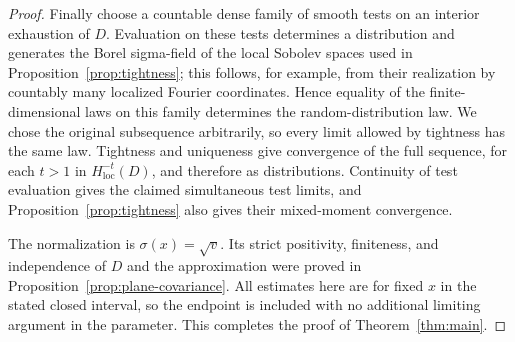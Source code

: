 \begin{proof}
Finally choose a countable dense family of smooth tests on an
interior exhaustion of \(D\).  Evaluation on these tests determines
a distribution and generates the Borel sigma-field of the local
Sobolev spaces used in Proposition~\ref{prop:tightness}; this follows,
for example, from their realization by countably many localized
Fourier coordinates.  Hence equality of the finite-dimensional
laws on this family determines the random-distribution law.
We chose the original subsequence arbitrarily, so every limit
allowed by tightness has the same law.  Tightness and uniqueness
give convergence of the full sequence, for each \(t>1\) in
\(H^{-t}_{\mathrm{loc}}(D)\), and therefore as distributions.
Continuity of test evaluation gives the claimed simultaneous
test limits, and Proposition~\ref{prop:tightness} also gives their
mixed-moment convergence.

The normalization is \(\sigma(x)=\sqrt v\).
Its strict positivity, finiteness, and independence of \(D\) and
the approximation were proved in
Proposition~\ref{prop:plane-covariance}.  All estimates here are
for fixed \(x\) in the stated closed interval, so the endpoint is
included with no additional limiting argument in the parameter.
This completes the proof of Theorem~\ref{thm:main}.
\end{proof}
